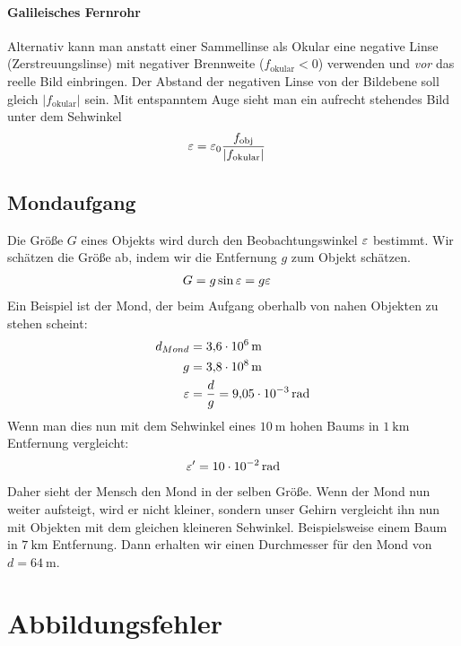 \paragraph{Galileisches Fernrohr}
Alternativ kann man anstatt einer Sammellinse als Okular eine negative
Linse (Zerstreuungslinse) mit negativer Brennweite ($f_\text{okular}<0$)
verwenden und \emph{vor} das reelle Bild einbringen. Der Abstand der
negativen Linse von der Bildebene soll gleich $\vert f_\text{okular}\vert$
sein.
Mit entspanntem Auge sieht man ein aufrecht stehendes Bild unter dem
Sehwinkel
\begin{align*}
	\varepsilon &= \varepsilon_0\frac{f_\text{obj}}{\vert f_\text{okular}\vert}
\end{align*}

\subsection{Mondaufgang}
Die Größe $G$ eines Objekts wird durch den Beobachtungswinkel $\varepsilon$ bestimmt.
Wir schätzen die Größe ab, indem wir die Entfernung $g$ zum Objekt schätzen.
\begin{align*}
	G &= g\sin\varepsilon=g\varepsilon
\end{align*}
Ein Beispiel ist der Mond, der beim Aufgang oberhalb von nahen Objekten zu
stehen scheint:
\begin{align*}
	d_{Mond} &= \SI{3,6e6}{\meter}\\
	g &= \SI{3,8e8}{\meter}\\
	\varepsilon &= \frac{d}{g}=\SI{9,05e-3}{\radian}
\end{align*}
Wenn man dies nun mit dem Sehwinkel eines $\SI{10}{\meter}$ hohen
Baums in $\SI{1}{\kilo\meter}$ Entfernung vergleicht:
\begin{align*}
	\varepsilon^\prime = \SI{10e-2}{\radian}
\end{align*}
Daher sieht der Mensch den Mond in der selben Größe. Wenn der Mond nun
weiter aufsteigt, wird er nicht kleiner, sondern unser Gehirn
vergleicht ihn nun mit Objekten mit dem gleichen kleineren
Sehwinkel. Beispielsweise einem Baum in $\SI{7}{\kilo\meter}$
Entfernung. Dann erhalten wir einen Durchmesser für den Mond von
$d=\SI{64}{\meter}$.

\section{Abbildungsfehler}
